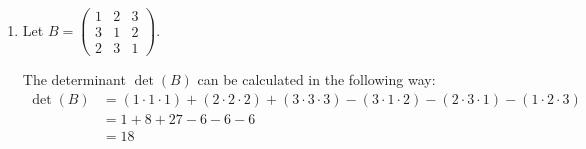 \documentclass{article}
\newcommand*{\mat}[1]{\begin{pmatrix}#1\end{pmatrix}}
\DeclareMathOperator{\adj}{adj}
\begin{document}
\begin{enumerate}
{\begin{enumerate}
{                    \begin{displaymath}
                        \adj(A) = \mat{-2 & -5 & 3 \\ -2 & -1  & 1 \\ -1 & 2 & -2}
                    \end{displaymath}
                    now we can finaly find the inverse
                    \begin{displaymath}
                        A^{-1} = \frac{1}{\det(A)}\cdot\adj(A) = \frac{1}{-7}\cdot\mat{-2 & -5 & 3 \\ -2 & -1  & 1 \\ -1 & 2 & -2} = \mat{{2 / 7} & {5 / 7} & {-3 / 7} \\ {2 / 7} & {1 / 7} & {-1 / 7} \\ {1 / 7} & {-2 / 7} & {2 / 7}}
                    \end{displaymath}
                }
                \item {
                    Let \(B = \mat{1 & 2 & 3 \\ 3 & 1 & 2 \\ 2 & 3 & 1}\).

                    The determinant \(\det(B)\) can be calculated in the following way:
                    \begin{displaymath}
                        \begin{aligned}
                            \det(B) &= 
                            (1 \cdot 1 \cdot 1) +
                            (2 \cdot 2 \cdot 2) +
                            (3 \cdot 3 \cdot 3) -
                            (3 \cdot 1 \cdot 2) -
                            (2 \cdot 3 \cdot 1) -
                            (1 \cdot 2 \cdot 3) \\
                            &= 1 + 8 + 27 - 6 - 6 - 6 \\
                            &= 18
                        \end{aligned}
                    \end{displaymath}

}
\end{enumerate}}
\end{enumerate}
\end{document}
